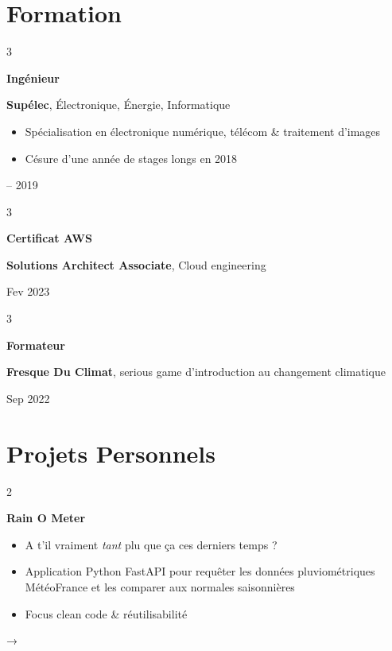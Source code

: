 \documentclass[10pt, letterpaper]{article}
\newenvironment{highlights}{
    \begin{itemize}[
        topsep=0.10 cm,
        parsep=0.10 cm,
        partopsep=0pt,
        itemsep=0pt,
        leftmargin=0.4 cm + 10pt
    ]
}{
    \end{itemize}
} %
\newenvironment{twocolentry}[2][]{
    \onecolentry
    \def\secondColumn{#2}
    \setcolumnwidth{\fill, 3.5 cm}
    \begin{paracol}{2}
}{
    \switchcolumn \raggedleft \secondColumn
    \end{paracol}
    \endonecolentry
} %
\newenvironment{threecolentry}[3][]{
    \onecolentry
    \def\thirdColumn{#3}
    \setcolumnwidth{2.5 cm, \fill, 3.5 cm}
    \begin{paracol}{3}
    {\raggedright #2} \switchcolumn
}{
    \switchcolumn \raggedleft \thirdColumn
    \end{paracol}
    \endonecolentry
} %
\let\hrefWithoutArrow\href
\renewcommand{\href}[2]{\hrefWithoutArrow{#1}{\ifthenelse{\equal{#2}{}}{ }{#2 }\raisebox{.15ex}{\footnotesize \faExternalLink*}}}
\begin{document}
    
    \section{Formation}



        
        \begin{threecolentry}{\textbf{Ingénieur}}{
            2015 – 2019
        }
            \textbf{Supélec}, Électronique, Énergie, Informatique
            \begin{highlights}
                \item Spécialisation en électronique numérique, télécom \& traitement d'images
                \item Césure d'une année de stages longs en 2018
            \end{highlights}
        \end{threecolentry}

        \vspace{0.2 cm}

        \begin{threecolentry}{\textbf{Certificat AWS}}{
            Fev 2023
        }
            \textbf{Solutions Architect Associate}, Cloud engineering
        \end{threecolentry}

        \vspace{0.2 cm}

        \begin{threecolentry}{\textbf{Formateur}}{
            Sep 2022
        }
            \textbf{Fresque Du Climat}, serious game d'introduction au changement climatique
        \end{threecolentry}


    
    \section{Projets Personnels}



        
        \begin{twocolentry}{
            → \href{https://github.com/Evlun1/rain_o_meter}{GitHub}
        }
            \textbf{Rain O Meter}
            \begin{highlights}
                \item A t'il vraiment \textit{tant} plu que ça ces derniers temps ?
                \item Application Python FastAPI pour requêter les données pluviométriques MétéoFrance et les comparer aux normales saisonnières
                \item Focus clean code \& réutilisabilité
            \end{highlights}
        \end{twocolentry}
\end{document}
